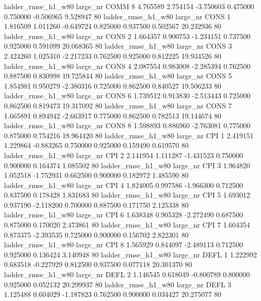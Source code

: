  ladder_rmse_h1_w80   large_nr     COMM                 8  4.765589  2.754154  -3.750603 0.475000 0.750000 -0.506965    9.528947 80
 ladder_rmse_h1_w80   large_nr     CONS                 1  1.816509  1.011260  -0.649724 0.825000 0.937500  0.502567   20.232936 80
 ladder_rmse_h1_w80   large_nr     CONS                 2  1.664357  0.900753  -1.234151 0.737500 0.925000  0.591099   20.068365 80
 ladder_rmse_h1_w80   large_nr     CONS                 3  2.424260  1.025310  -2.217233 0.762500 0.925000  0.812225   19.934526 80
 ladder_rmse_h1_w80   large_nr     CONS                 4  2.087554  0.983008  -2.285394 0.762500 0.887500  0.830998   19.725844 80
 ladder_rmse_h1_w80   large_nr     CONS                 5  1.854981  0.950279  -2.380316 0.725000 0.862500  0.840527   19.506233 80
 ladder_rmse_h1_w80   large_nr     CONS                 6  1.739512  0.913830  -2.513443 0.725000 0.862500  0.819473   19.317092 80
 ladder_rmse_h1_w80   large_nr     CONS                 7  1.665891  0.894942  -2.663917 0.775000 0.862500  0.782513   19.144674 80
 ladder_rmse_h1_w80   large_nr     CONS                 8  1.598893  0.886960  -2.763081 0.775000 0.875000  0.754216   18.964420 80
 ladder_rmse_h1_w80   large_nr      CPI                 1  2.419151  1.229864  -0.883265 0.750000 0.925000  0.159490    0.619570 80
 ladder_rmse_h1_w80   large_nr      CPI                 2  2.141954  1.111287  -1.431523 0.750000 0.900000  0.164374    1.085502 80
 ladder_rmse_h1_w80   large_nr      CPI                 3  1.964820  1.052518  -1.752931 0.662500 0.900000  0.182972    1.485590 80
 ladder_rmse_h1_w80   large_nr      CPI                 4  1.824005  0.997586  -1.966300 0.712500 0.837500  0.178428    1.831683 80
 ladder_rmse_h1_w80   large_nr      CPI                 5  1.693012  0.937190  -2.118200 0.700000 0.887500  0.171750    2.125338 80
 ladder_rmse_h1_w80   large_nr      CPI                 6  1.638348  0.905328  -2.272490 0.687500 0.875000  0.170020    2.473861 80
 ladder_rmse_h1_w80   large_nr      CPI                 7  1.604354  0.873375  -2.393535 0.725000 0.900000  0.156702    2.822301 80
 ladder_rmse_h1_w80   large_nr      CPI                 8  1.565929  0.844097  -2.489113 0.712500 0.925000  0.136424    3.140948 80
 ladder_rmse_h1_w80   large_nr     DEFL                 1  1.222992  0.683518  -0.227929 0.812500 0.937500  0.077118   20.301370 80
 ladder_rmse_h1_w80   large_nr     DEFL                 2  1.146545  0.618049  -0.800789 0.800000 0.925000  0.052132   20.299937 80
 ladder_rmse_h1_w80   large_nr     DEFL                 3  1.125488  0.604029  -1.187823 0.762500 0.900000  0.034427   20.275077 80
